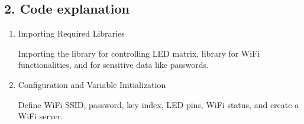 \documentclass[a4paper,11pt,english]{sphinxmanual}
\begin{document}
\subsection{2. Code explanation}
\label{\detokenize{Extension_Project/Web_Control_Relay:code-explanation}}\begin{enumerate}
%
\item {} 
\sphinxAtStartPar
Importing Required Libraries

\sphinxAtStartPar
Importing the  library for controlling LED matrix,  library for WiFi functionalities, and  for sensitive data like passwords.

\begin{sphinxVerbatim}[commandchars=\\\{\}]
\end{sphinxVerbatim}

\item {} 
\sphinxAtStartPar
Configuration and Variable Initialization

\sphinxAtStartPar
Define WiFi SSID, password, key index, LED pins, WiFi status, and create a WiFi server.

\begin{sphinxVerbatim}[commandchars=\\\{\}]

\PYG{p}{[}\PYG{p}{]}
\PYG{p}{[}\PYG{p}{]}
\end{sphinxVerbatim}


\end{enumerate}
\end{document}
